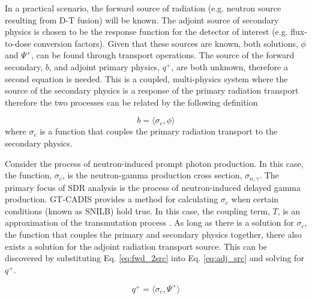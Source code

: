 In a practical scenario, the forward source of radiation (e.g. neutron
source resulting from D-T fusion) will be known.  
The adjoint source of secondary physics is chosen to be the response function for the
detector of interest (e.g. flux-to-dose conversion factors).
Given that these sources are known, both solutions, $ \phi $ and
$\Psi^{+} $, can be found through transport operations.
The source of the forward secondary, $b$,  and adjoint primary physics,
$q^{+}$, are both unknown, therefore a second equation is needed.  
This is a coupled, multi-physics system where the source of the secondary physics is
a response of the primary radiation transport therefore the two processes can be related
by the following definition%

 \begin{equation}\label{eq:fwd_2src}
	 b =
	 \langle \sigma_c, \phi \rangle
 \end{equation}
where $\sigma_c$ is a function that couples the primary
radiation transport to the secondary physics.

Consider the process of neutron-induced prompt photon production.
In this case, the function, $\sigma_c$, is the neutron-gamma production
cross section, $\sigma_{n,\gamma}$.  The primary focus of SDR analysis
is the process of neutron-induced delayed gamma production. 
GT-CADIS provides a method for calculating $\sigma_c$ when
certain conditions (known as SNILB) hold true. In this case, the
coupling term, $T$, is an approximation of the transmutation
process \cite{gtcadis}.  As long as there is a solution for $\sigma_c$, the
function that couples the primary and secondary physics together,
there also exists a solution for the adjoint radiation transport source.
This can be discovered by substituting Eq. \ref{eq:fwd_2src} into Eq. 
\ref{eq:adj_src} and solving for $q^{+}$.

 \begin{equation}\label{eq:adj_1src}
	 q^{+} = 
	 \langle \sigma_c, \Psi^{+} \rangle
 \end{equation}


